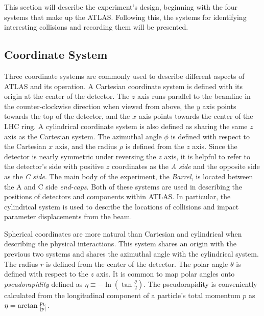 This section will describe the experiment's design, beginning with the four systems that make up the ATLAS.
Following this, the systems for identifying interesting collisions and recording them will be presented.

\subsection{Coordinate System}

Three coordinate systems are commonly used to describe different aspects of ATLAS and its operation.
A Cartesian coordinate system is defined with its origin at the center of the detector.
The $z$ axis runs parallel to the beamline in the counter-clockwise direction when viewed from above, the $y$ axis points towards the top of the detector, and the $x$ axis points towards the center of the LHC ring.
A cylindrical coordinate system is also defined as sharing the same $z$ axis as the Cartesian system.
The azimuthal angle $\phi$ is defined with respect to the Cartesian $x$ axis, and the radius $\rho$ is defined from the $z$ axis.
Since the detector is nearly symmetric under reversing the $z$ axis, it is helpful to refer to the detector's side with positive $z$ coordinates as the \emph{A side} and the opposite side as the \emph{C side}.
The main body of the experiment, the \emph{Barrel}, is located between the A and C side \emph{end-caps}.
Both of these systems are used in describing the positions of detectors and components within ATLAS.
In particular, the cylindrical system is used to describe the locations of collisions and impact parameter displacements from the beam.

Spherical coordinates are more natural than Cartesian and cylindrical when describing the physical interactions.
This system shares an origin with the previous two systems and shares the azimuthal angle with the cylindrical system.
The radius $r$ is defined from the center of the detector.
The polar angle $\theta$ is defined with respect to the $z$ axis.
It is common to map polar angles onto \emph{pseudorapidity} defined as $\eta\equiv-\ln(\tan\frac{\theta}{2})$.
The pseudorapidity is conveniently calculated from the longitudinal component \plong of a particle's total momentum $p$ as $\eta=\arctan{\frac{\ensuremath{p_\text{L}}}{|p|}}$.


